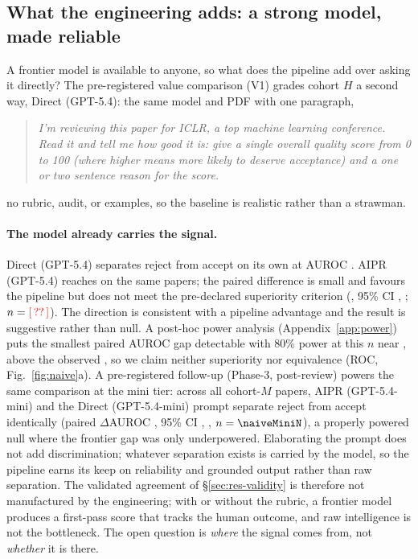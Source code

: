 \subsection{What the engineering adds: a strong model, made reliable}
\label{sec:res-value}
A frontier model is available to anyone, so what does the pipeline add over asking it
directly? The pre-registered value comparison (V1) grades cohort $H$ a second way,
Direct (GPT-5.4): the same model and PDF with one paragraph,
\begin{quote}\itshape
I'm reviewing this paper for ICLR, a top machine learning conference. Read it and tell me
how good it is: give a single overall quality score from 0 to 100 (where higher means
more likely to deserve acceptance) and a one or two sentence reason for the score.
\end{quote}
\noindent no rubric, audit, or examples, so the baseline is realistic rather than a
strawman.

\paragraph{The model already carries the signal.}
Direct (GPT-5.4) separates reject from accept on its own at AUROC \aurocNaiveFull{}. AIPR
(GPT-5.4) reaches \aurocFullFull{} on the same papers; the paired difference is small and
favours the pipeline but does not meet the pre-declared superiority criterion
(\aurocDiffFullNaive, 95\% CI \aurocDiffCI, \aurocDiffPrel; $n=\textcolor{red}{[\,??\,]}$). The direction is
consistent with a pipeline advantage and the result is suggestive rather than null. A
post-hoc power analysis (Appendix~\ref{app:power}) puts the smallest paired AUROC gap
detectable with 80\% power at this $n$ near \mdeAUROCdiff, above the observed
\aurocDiffFullNaive, so we claim neither superiority nor equivalence (ROC,
Fig.~\ref{fig:naive}a). A pre-registered follow-up (Phase-3, post-review) powers the same
comparison at the mini tier: across all \naiveMiniN{} cohort-$M$ papers, AIPR (GPT-5.4-mini)
and the Direct (GPT-5.4-mini) prompt separate reject from accept identically (paired
$\Delta$AUROC \aurocDiffMiniMini{}, 95\% CI \aurocDiffMiniCI, \aurocDiffMiniPrel{},
$n=\naiveMiniN$), a properly powered null where the frontier gap was only underpowered.
Elaborating the prompt does not add discrimination; whatever separation exists is carried by
the model, so the pipeline earns its keep on reliability and grounded output rather than raw
separation. The validated agreement of \S\ref{sec:res-validity} is therefore
not manufactured by the engineering; with or without the rubric, a frontier model produces
a first-pass score that tracks the human outcome, and raw intelligence is not the
bottleneck. The open question is \emph{where} the signal comes from, not \emph{whether} it
is there.


